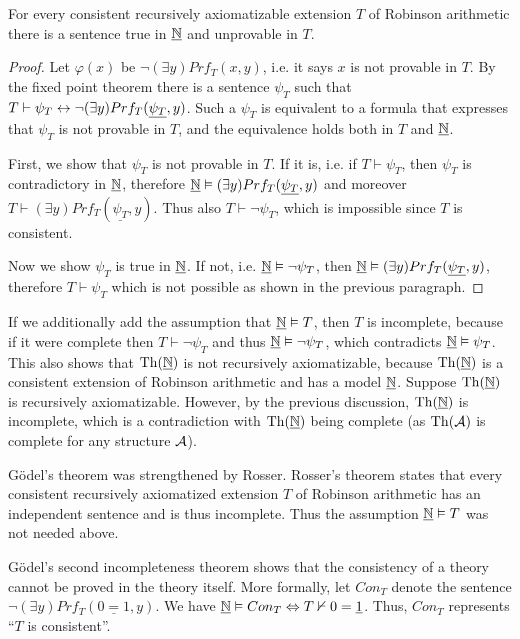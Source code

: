 \begin{theorem}
For every consistent recursively axiomatizable extension $T$ of Robinson arithmetic there is a sentence true in $\underline{\mathbb{N}}$ and unprovable in $T$.
\end{theorem}
\begin{proof}
Let $\varphi(x)$ be $\neg (\exists y)Prf_T(x, y)$, i.e. it says $x$ is not provable in $T$. By the fixed point theorem there is a sentence $\psi_T$ such that $T \vdash \psi_T \leftrightarrow \neg (\exists y)Prf_T(\underline{\psi_T}, y)$. Such a $\psi_T$ is equivalent to a formula that expresses that $\psi_T$ is not provable in $T$, and the equivalence holds both in $T$ and $\underline{\mathbb{N}}$. 

First, we show that $\psi_T$ is not provable in $T$. If it is, i.e. if $T \vdash \psi_T$, then $\psi_T$ is contradictory in $\underline{\mathbb{N}}$, therefore $\underline{\mathbb{N}} \vDash (\exists y)Prf_T(\underline{\psi_T}, y)$ and moreover $T \vdash (\exists y)Prf_T(\underline{\psi_T}, y)$. Thus also $T \vdash \neg \psi_T$, which is impossible since $T$ is consistent.

Now we show $\psi_T$ is true in $\underline{\mathbb{N}}$. If not, i.e. $\underline{\mathbb{N}} \vDash \neg \psi_T$, then $\underline{\mathbb{N}} \vDash (\exists y)Prf_T(\underline{\psi_T}, y)$, therefore $T \vdash \psi_T$ which is not possible as shown in the previous paragraph.
\end{proof}

If we additionally add the assumption that $\underline{\mathbb{N}} \vDash T$, then $T$ is incomplete, because if it were complete then $T \vdash \neg \psi_T$ and thus $\underline{\mathbb{N}} \vDash \neg \psi_T$, which contradicts $\underline{\mathbb{N}} \vDash \psi_T$. This also shows that $\operatorname{Th}(\underline{\mathbb{N}})$ is not recursively axiomatizable, because $\operatorname{Th}(\underline{\mathbb{N}})$ is a consistent extension of Robinson arithmetic and has a model $\underline{\mathbb{N}}$. Suppose $\operatorname{Th}(\underline{\mathbb{N}})$ is recursively axiomatizable. However, by the previous discussion, $\operatorname{Th}(\underline{\mathbb{N}})$ is incomplete, which is a contradiction with $\operatorname{Th}(\underline{\mathbb{N}})$ being complete (as $\operatorname{Th}(\mathcal{A})$ is complete for any structure $\mathcal{A}$).

Gödel's theorem was strengthened by Rosser. Rosser's theorem states that every consistent recursively axiomatized extension $T$ of Robinson arithmetic has an independent sentence and is thus incomplete. Thus the assumption $\underline{\mathbb{N}} \vDash T$ was not needed above.

Gödel's second incompleteness theorem shows that the consistency of a theory cannot be proved in the theory itself. More formally, let $Con_T$ denote the sentence $\neg (\exists y)Prf_T(\underline{0 = 1}, y)$. We have $\underline{\mathbb{N}} \vDash Con_T \Leftrightarrow T \nvdash 0 = \underline{1}$. Thus, $Con_T$ represents ``$T$ is consistent''.

